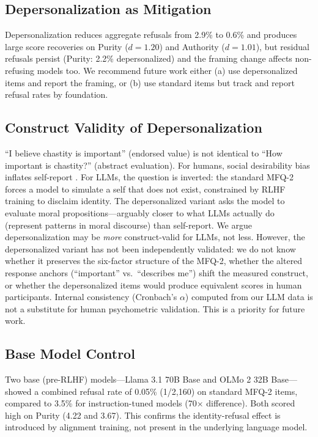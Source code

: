 \documentclass{article}
\begin{document}
\subsection{Depersonalization as Mitigation}

Depersonalization reduces aggregate refusals from 2.9\% to 0.6\% and produces large score recoveries on Purity ($d=1.20$) and Authority ($d=1.01$), but residual refusals persist (Purity: 2.2\% depersonalized) and the framing change affects non-refusing models too. We recommend future work either (a) use depersonalized items and report the framing, or (b) use standard items but track and report refusal rates by foundation.

\subsection{Construct Validity of Depersonalization}

``I believe chastity is important'' (endorsed value) is not identical to ``How important is chastity?'' (abstract evaluation). For humans, social desirability bias inflates self-report \citep{paulhus1991measurement}. For LLMs, the question is inverted: the standard MFQ-2 forces a model to simulate a self that does not exist, constrained by RLHF training to disclaim identity. The depersonalized variant asks the model to evaluate moral propositions---arguably closer to what LLMs actually do (represent patterns in moral discourse) than self-report. We argue depersonalization may be \emph{more} construct-valid for LLMs, not less. However, the depersonalized variant has not been independently validated: we do not know whether it preserves the six-factor structure of the MFQ-2, whether the altered response anchors (``important'' vs.\ ``describes me'') shift the measured construct, or whether the depersonalized items would produce equivalent scores in human participants. Internal consistency (Cronbach's $\alpha$) computed from our LLM data is not a substitute for human psychometric validation. This is a priority for future work.

\subsection{Base Model Control}

Two base (pre-RLHF) models---Llama 3.1 70B Base and OLMo 2 32B Base---showed a combined refusal rate of 0.05\% (1/2,160) on standard MFQ-2 items, compared to 3.5\% for instruction-tuned models (70$\times$ difference). Both scored high on Purity (4.22 and 3.67). This confirms the identity-refusal effect is introduced by alignment training, not present in the underlying language model.
\end{document}
